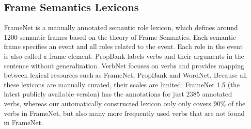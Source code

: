 \subsection{Frame Semantics Lexicons}
%
%
FrameNet is a manually annotated semantic role lexicon,
which defines around 1200 semantic frames based on
the theory of Frame Semantics. Each semantic frame specifies an event
and all roles related to the event. Each role in the event
is also called a frame element.
PropBank labels verbs and their arguments
in the sentence without generalization.
VerbNet\cite{KipperDP00} focuses on verbs and provides mapping
between lexical resources such as FrameNet, PropBank and WordNet.
Because all these lexicons are manually curated, their scales are
limited: FrameNet 1.5 (the latest publicly available  version) 
has the annotations for just 2385 annotated verbs, 
whereas our automatically constructed lexicon only only 
covers 90\% of the verbs in FrameNet,
but also many more frequently used verbs that are not found in
FrameNet.  

